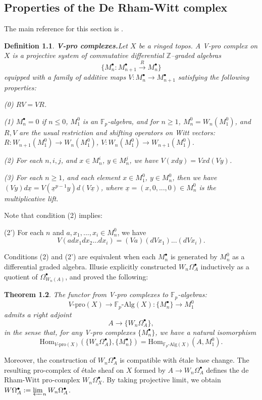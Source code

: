 \documentclass[a4paper,12pt,twoside]{report}
\newtheorem{theorem}{Theorem}[section]
\newtheorem{definition}[theorem]{Definition}
\newcommand{\Z}{\mathbb{Z}}
\newcommand{\F}{\mathbb{F}}
\newcommand{\Hom}{\mathrm{Hom}}
\begin{document}
\begin{appendices}  
    \chapter{Properties of the De Rham-Witt complex}
    
    The main reference for this section is \cite{Il1}. 
    
    \begin{definition}{\bf V-pro complexes.}\label{Vpro}
        Let $X$ be a ringed topos. A V-pro complex on $X$ is a projective system of commutative differential $\Z$--graded algebras
        \[\{M_n^\bullet: M_{n+1}^\bullet \xrightarrow{R} M_n^\bullet\}\]
        equipped with a family of additive maps $V:M_n^\bullet\rightarrow M_{n+1}^\bullet$
        satisfying the following properties: 
    
        {\rm (0)} $RV=VR$. 
    
        {\rm (1)} $M_n^\bullet=0$ if $n\leqslant 0$, $M_1^0$ is an $\F_p$-algebra, and for $n\geqslant 1$, $M_n^0=W_n(M_1^0)$, 
        and $R,V$ are the usual restriction and shifting operators on Witt vectors: 
        $R:W_{n+1}(M_1^0)\rightarrow W_n(M_1^0)$, $V:W_{n}(M_1^0)\rightarrow W_{n+1}(M_1^0)$. 
    
        {\rm (2)} For each $n,i,j$, and $x\in M_n^i$, $y\in M_n^j$, we have $V(xdy)=Vxd(Vy)$. 
    
        {\rm (3)} For each $n\geqslant 1$, and each element $x\in M_1^0$, $y\in M_n^0$, 
        then we have $(Vy)d\underline{x}=V(\underline{x}^{p-1}y)d(V\underline{x})$, 
        where $\underline{x}=(x,0,...,0)\in M_n^0$ is the multiplicative lift.
    \end{definition}
    
    Note that condition (2) implies: 
    
    {\rm (2')}  For each $n$ and $a,x_1,...,x_i\in M_n^0$, we have \[V(adx_1dx_2...dx_i)=(Va)(dVx_1)...(dVx_i).\]
    
    Conditions (2) and (2') are equivalent when each $M_n^\bullet$ is generated by $M_n^0$ as a differential graded algebra. 
    Illusie explicitly constructed $W_n\Omega_A^\bullet$ inductively as a quotient of $\Omega^\bullet_{W_n(A)}$, 
    and proved the following:  
    \begin{theorem}
        The functor from V-pro complexes to $\F_p$-algebras: 
        \[V\text{-}\mathrm{pro}(X)\rightarrow \F_p\text{-}\mathrm{Alg}(X): \{M_n^\bullet\}\rightarrow M_1^0\]
        admits a right adjoint \[A\rightarrow \{W_n\Omega^\bullet_A\},\] 
        in the sense that, for any V-pro complexes $\{M_n^\bullet\}$, we have a natural isomorphism 
        \[\Hom_{V\text{-}\mathrm{pro}(X)}(\{W_{n} \Omega^{\bullet}_A\},\{M_{n}^{\bullet}\})=\Hom_{\F_p\text{-}\mathrm{Alg}(X)}(A,M_1^0).\]
    \end{theorem}
    Moreover, the construction of $W_n\Omega^\bullet_A$ is compatible with \'etale base change. 
    The resulting pro-complex of \'etale sheaf on $X$ formed by $A\rightarrow W_n\Omega^\bullet_A$ 
    defines the de Rham-Witt pro-complex $W_n\Omega^\bullet_{X}$. 
    By taking projective limit, we obtain $W\Omega_{A}^\bullet:=\varprojlim_{n}W_n\Omega_A^\bullet$. 
    

\end{appendices}
\end{document}
